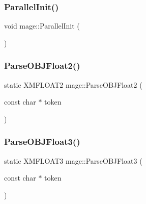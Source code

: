 \hypertarget{namespacemage_a14b68ac56f898260b891bd264b57dd73}{}\label{namespacemage_a14b68ac56f898260b891bd264b57dd73} 
\subsubsection{\texorpdfstring{Parallel\+Init()}{ParallelInit()}}
{\footnotesize\ttfamily void mage\+::\+Parallel\+Init (\begin{DoxyParamCaption}{ }\end{DoxyParamCaption})}

\hypertarget{namespacemage_a67f3c57c7dcc1ad50c7a8f5167d50b64}{}\label{namespacemage_a67f3c57c7dcc1ad50c7a8f5167d50b64} 
\subsubsection{\texorpdfstring{Parse\+O\+B\+J\+Float2()}{ParseOBJFloat2()}}
{\footnotesize\ttfamily static X\+M\+F\+L\+O\+A\+T2 mage\+::\+Parse\+O\+B\+J\+Float2 (\begin{DoxyParamCaption}\item[{const char $\ast$}]{token }\end{DoxyParamCaption})\hspace{0.3cm}{\ttfamily [static]}}

\hypertarget{namespacemage_a926f2772c637d2b5c839a936cd8dbdd1}{}\label{namespacemage_a926f2772c637d2b5c839a936cd8dbdd1} 
\subsubsection{\texorpdfstring{Parse\+O\+B\+J\+Float3()}{ParseOBJFloat3()}}
{\footnotesize\ttfamily static X\+M\+F\+L\+O\+A\+T3 mage\+::\+Parse\+O\+B\+J\+Float3 (\begin{DoxyParamCaption}\item[{const char $\ast$}]{token }\end{DoxyParamCaption})\hspace{0.3cm}{\ttfamily [static]}}

\hypertarget{namespacemage_a4545e24f19ab29730871b8c9861e48fc}{}\label{namespacemage_a4545e24f19ab29730871b8c9861e48fc} 
